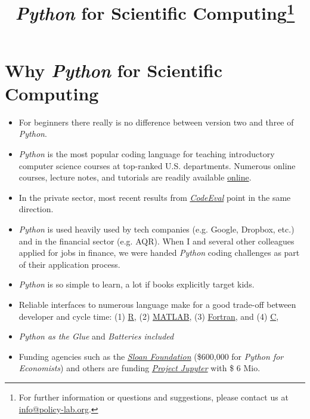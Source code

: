 
\title{\textit{Python} for Scientific Computing\thanks{For further information or questions and suggestions, please contact us at \href{mailto: info@policy-lab.org}{info@policy-lab.org}.}}
\author{ }
\date{ } 


\section{Why \textit{Python} for Scientific Computing}

\begin{itemize}
\item For beginners there really is no difference between version two and three of \textit{Python}.
\item \textit{Python} is the most popular coding language for teaching introductory computer science courses at top-ranked U.S. departments. Numerous online courses, lecture notes, and tutorials are readily available \href{http://www.fullstackpython.com/best-python-resources.html}{online}.
\item In the private sector, most recent results from \href{https://www.codeeval.com}{\textit{CodeEval}} point in the same direction.
\item \textit{Python} is used heavily used by tech companies (e.g. Google, Dropbox, etc.) and in the financial sector (e.g. AQR). When I and several other colleagues applied for jobs in finance, we were handed \textit{Python} coding challenges as part of their application process.
\item \textit{Python} is so simple to learn, a lot if books explicitly target kids. 
\item Reliable interfaces to numerous language make for a good trade-off between developer and cycle time: (1) \href{https://www.r-project.org}{R}, (2) \href{www.mathworks.com}{MATLAB}, (3) \href{https://en.wikipedia.org/wiki/Fortran}{Fortran}, and (4) \href{ttps://en.wikipedia.org/wiki/C_(programming_language}{C},
\item \textit{Python as the Glue} and \textit{Batteries included}
\item Funding agencies such as the \href{http://www.sloan.org/}{\textit{Sloan Foundation}} (\$600,000 for \textit{Python for Economists}) and others are funding \href{http://jupyter.org/}{\textit{Project Jupyter}} with \$ 6 Mio.	
\end{itemize}

